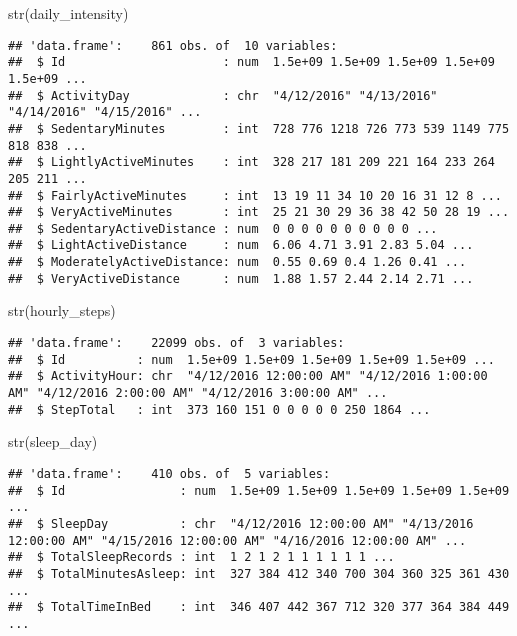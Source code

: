\documentclass[
]{article}
\newenvironment{Shaded}{\begin{snugshade}}{\end{snugshade}}
\newcommand{\FunctionTok}[1]{\textcolor[rgb]{0.00,0.00,0.00}{#1}}
\newcommand{\NormalTok}[1]{#1}
\begin{document}
\begin{Shaded}
\begin{Highlighting}[]
\FunctionTok{str}\NormalTok{(daily\_intensity)}
\end{Highlighting}
\end{Shaded}

\begin{verbatim}
## 'data.frame':    861 obs. of  10 variables:
##  $ Id                      : num  1.5e+09 1.5e+09 1.5e+09 1.5e+09 1.5e+09 ...
##  $ ActivityDay             : chr  "4/12/2016" "4/13/2016" "4/14/2016" "4/15/2016" ...
##  $ SedentaryMinutes        : int  728 776 1218 726 773 539 1149 775 818 838 ...
##  $ LightlyActiveMinutes    : int  328 217 181 209 221 164 233 264 205 211 ...
##  $ FairlyActiveMinutes     : int  13 19 11 34 10 20 16 31 12 8 ...
##  $ VeryActiveMinutes       : int  25 21 30 29 36 38 42 50 28 19 ...
##  $ SedentaryActiveDistance : num  0 0 0 0 0 0 0 0 0 0 ...
##  $ LightActiveDistance     : num  6.06 4.71 3.91 2.83 5.04 ...
##  $ ModeratelyActiveDistance: num  0.55 0.69 0.4 1.26 0.41 ...
##  $ VeryActiveDistance      : num  1.88 1.57 2.44 2.14 2.71 ...
\end{verbatim}

\begin{Shaded}
\begin{Highlighting}[]
\FunctionTok{str}\NormalTok{(hourly\_steps)}
\end{Highlighting}
\end{Shaded}

\begin{verbatim}
## 'data.frame':    22099 obs. of  3 variables:
##  $ Id          : num  1.5e+09 1.5e+09 1.5e+09 1.5e+09 1.5e+09 ...
##  $ ActivityHour: chr  "4/12/2016 12:00:00 AM" "4/12/2016 1:00:00 AM" "4/12/2016 2:00:00 AM" "4/12/2016 3:00:00 AM" ...
##  $ StepTotal   : int  373 160 151 0 0 0 0 0 250 1864 ...
\end{verbatim}

\begin{Shaded}
\begin{Highlighting}[]
\FunctionTok{str}\NormalTok{(sleep\_day)}
\end{Highlighting}
\end{Shaded}

\begin{verbatim}
## 'data.frame':    410 obs. of  5 variables:
##  $ Id                : num  1.5e+09 1.5e+09 1.5e+09 1.5e+09 1.5e+09 ...
##  $ SleepDay          : chr  "4/12/2016 12:00:00 AM" "4/13/2016 12:00:00 AM" "4/15/2016 12:00:00 AM" "4/16/2016 12:00:00 AM" ...
##  $ TotalSleepRecords : int  1 2 1 2 1 1 1 1 1 1 ...
##  $ TotalMinutesAsleep: int  327 384 412 340 700 304 360 325 361 430 ...
##  $ TotalTimeInBed    : int  346 407 442 367 712 320 377 364 384 449 ...
\end{verbatim}
\end{document}
